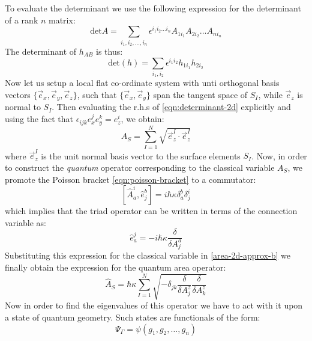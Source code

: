 \documentclass[submission, Phys]{SciPost}
\begin{document}
To evaluate the determinant we use the following expression for the determinant of a rank $ n $ matrix:
\begin{equation}\label{eqn:determinant}
	\text{det} A = \sum_{i_1, i_2, \ldots,i_n} \epsilon^{i_1 i_2 \ldots i_n} A_{1 i_1} A_{2 i_2}\ldots A_{n i_n}
\end{equation}
The determinant of $ h_{AB} $ is thus:
\begin{equation}\label{eqn:determinant-2d}
	\text{det} (h) = \sum_{i_1,i_2} \epsilon^{i_1 i_2} h_{1 i_1} h_{2 i_2}
\end{equation}
Now let us setup a local flat co-ordinate system with unti orthogonal basis vectors $ \{\vec{e}_x, \vec{e}_y, \vec{e}_z\} $, such that $ \{ \vec{e}_x, \vec{e}_y \} $ span the tangent space of $ S_I $, while $ \vec{e}_z $ is normal to $ S_I $. Then evaluating the r.h.s of \eqref{eqn:determinant-2d} explicitly and using the fact that $ \epsilon_{ijk} e_x^j e_y^k = e_z^i $, we obtain:
\begin{equation}\label{area-2d-approx-b}
	A_S = \sum_{I=1}^N \sqrt{\vec{e}^I_z \cdot \vec{e}^I_z}
\end{equation}
where $ \vec{e}^I_z $ is the unit normal basis vector to the surface elements $ S_I $. Now, in order to construct the \emph{quantum} operator corresponding to the classical variable $ A_S $, we promote the Poisson bracket \eqref{eqn:poisson-bracket} to a commutator:
\begin{equation}\label{eqn:lqg-commutator}
[ \hat A_a^i, \hat e^b_j ] = i \hbar \kappa \delta^b_a \delta^i_j
\end{equation}
which implies that the triad operator can be written in terms of the connection variable as:
\begin{equation}\label{eqn:triad-operator}
	\hat e_a^j = -i\hbar \kappa \frac{\delta}{\delta A^a_j}
\end{equation}
Substituting this expression for the classical variable in \eqref{area-2d-approx-b} we finally obtain the expression for the quantum area operator:
\begin{equation}\label{eqn:area-quantum}
	\hat A_S = \hbar \kappa \sum_{I=1}^N \sqrt{ - \delta_{jk} \frac{\delta}{\delta A^z_j} \frac{\delta}{\delta A^z_k}} 
\end{equation}
Now in order to find the eigenvalues of this operator we have to act with it upon a state of quantum geometry. Such states are functionals of the form:
\begin{equation}\label{eqn:graph-state}
	\Psi_\Gamma = \psi(g_1,g_2,\ldots,g_n)
\end{equation}
\end{document}
